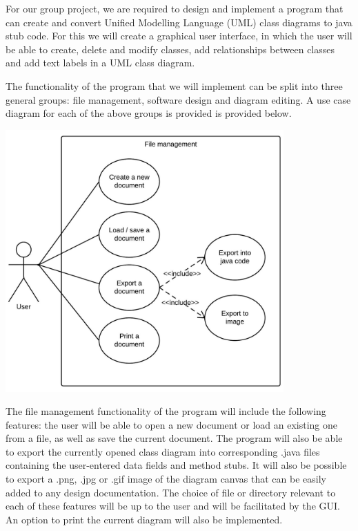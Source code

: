 
\tab For our group project, we are required to design and implement a program that can create and convert Unified Modelling Language (UML) class diagrams to java stub code. For this we will create a graphical user interface, in which the user will be able to create, delete and modify classes, add relationships between classes and add text labels in a UML class diagram. 

The functionality of the program that we will implement can be split into three general groups: file management, software design and diagram editing. A use case diagram for each of the above groups is provided is provided below. 

\vspace{-10pt}
\begin{center}
	\includegraphics[width=0.8\textwidth]{FileManagementUseCaseDiagram.png}
\end{center}
\vspace{-10pt}

The file management functionality of the program will include the following features: the user will be able to open a new document or load an existing one from a file, as well as save the current document. The program will also be able to export the currently opened class diagram into corresponding .java files containing the user-entered data fields and method stubs. It will also be possible to export a .png, .jpg or .gif image of the diagram canvas that can be easily added to any design documentation. The choice of file or directory relevant to each of these features will be up to the user and will be facilitated by the GUI. An option to print the current diagram will also be implemented.
 

